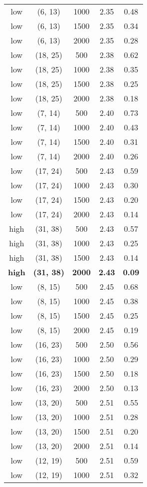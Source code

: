 \begin{tabular}{c c c c c}
low & (6, 13) &  1000 & 2.35 & 0.48 \\
low & (6, 13) &  1500 & 2.35 & 0.34 \\
low & (6, 13) &  2000 & 2.35 & 0.28 \\
low & (18, 25) &  500 & 2.38 & 0.62 \\
low & (18, 25) &  1000 & 2.38 & 0.35 \\
low & (18, 25) &  1500 & 2.38 & 0.25 \\
low & (18, 25) &  2000 & 2.38 & 0.18 \\
low & (7, 14) &  500 & 2.40 & 0.73 \\
low & (7, 14) &  1000 & 2.40 & 0.43 \\
low & (7, 14) &  1500 & 2.40 & 0.31 \\
low & (7, 14) &  2000 & 2.40 & 0.26 \\
low & (17, 24) &  500 & 2.43 & 0.59 \\
low & (17, 24) &  1000 & 2.43 & 0.30 \\
low & (17, 24) &  1500 & 2.43 & 0.20 \\
low & (17, 24) &  2000 & 2.43 & 0.14 \\
high & (31, 38) &  500 & 2.43 & 0.57 \\
high & (31, 38) &  1000 & 2.43 & 0.25 \\
high & (31, 38) &  1500 & 2.43 & 0.14 \\
\textbf{high} & \textbf{(31, 38)} & \textbf{ 2000} & \textbf{2.43} & \textbf{0.09} \\
low & (8, 15) &  500 & 2.45 & 0.68 \\
low & (8, 15) &  1000 & 2.45 & 0.38 \\
low & (8, 15) &  1500 & 2.45 & 0.25 \\
low & (8, 15) &  2000 & 2.45 & 0.19 \\
low & (16, 23) &  500 & 2.50 & 0.56 \\
low & (16, 23) &  1000 & 2.50 & 0.29 \\
low & (16, 23) &  1500 & 2.50 & 0.18 \\
low & (16, 23) &  2000 & 2.50 & 0.13 \\
low & (13, 20) &  500 & 2.51 & 0.55 \\
low & (13, 20) &  1000 & 2.51 & 0.28 \\
low & (13, 20) &  1500 & 2.51 & 0.20 \\
low & (13, 20) &  2000 & 2.51 & 0.14 \\
low & (12, 19) &  500 & 2.51 & 0.59 \\
low & (12, 19) &  1000 & 2.51 & 0.32 \\

\end{tabular}

